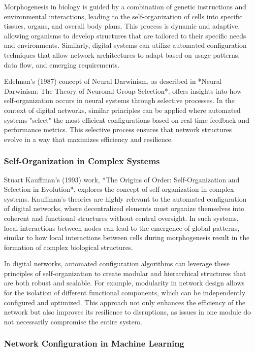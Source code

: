 \documentclass[12pt,twoside]{article}
\begin{document}
Morphogenesis in biology is guided by a combination of genetic instructions and environmental interactions, leading to the self-organization of cells into specific tissues, organs, and overall body plans. This process is dynamic and adaptive, allowing organisms to develop structures that are tailored to their specific needs and environments. Similarly, digital systems can utilize automated configuration techniques that allow network architectures to adapt based on usage patterns, data flow, and emerging requirements.

Edelman’s (1987) concept of Neural Darwinism, as described in *Neural Darwinism: The Theory of Neuronal Group Selection*, offers insights into how self-organization occurs in neural systems through selective processes. In the context of digital networks, similar principles can be applied where automated systems "select" the most efficient configurations based on real-time feedback and performance metrics. This selective process ensures that network structures evolve in a way that maximizes efficiency and resilience.

\subsubsection{Self-Organization in Complex Systems}

Stuart Kauffman’s (1993) work, *The Origins of Order: Self-Organization and Selection in Evolution*, explores the concept of self-organization in complex systems. Kauffman’s theories are highly relevant to the automated configuration of digital networks, where decentralized elements must organize themselves into coherent and functional structures without central oversight. In such systems, local interactions between nodes can lead to the emergence of global patterns, similar to how local interactions between cells during morphogenesis result in the formation of complex biological structures.

In digital networks, automated configuration algorithms can leverage these principles of self-organization to create modular and hierarchical structures that are both robust and scalable. For example, modularity in network design allows for the isolation of different functional components, which can be independently configured and optimized. This approach not only enhances the efficiency of the network but also improves its resilience to disruptions, as issues in one module do not necessarily compromise the entire system.


\subsubsection{Network Configuration in Machine Learning}
\end{document}
